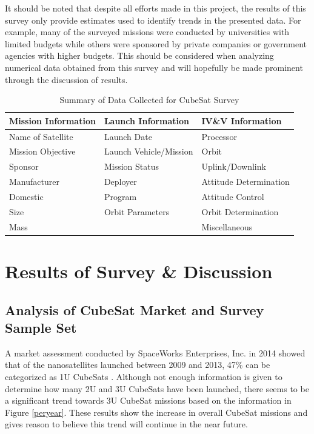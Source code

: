 \documentclass[11pt]{article}
\begin{document}
It should be noted that despite all efforts made in this project, the results of this survey only provide estimates used to identify trends in the presented data.  For example, many of the surveyed missions were conducted by universities with limited budgets while others were sponsored by private companies or government agencies with higher budgets.  This should be considered when analyzing numerical data obtained from this survey and will hopefully be made prominent through the discussion of results. 

\begin{table}[h]
\small
\centering
\caption{Summary of Data Collected for CubeSat Survey}
\label{summary}
\begin{tabular}{|l|l|l|}
\hline
\textbf{Mission Information} & \textbf{Launch Information} & \textbf{IV\&V Information} \\ \hline
Name of Satellite & Launch Date & Processor \\ \hline
Mission Objective & Launch Vehicle/Mission & Orbit \\ \hline
Sponsor & Mission Status & Uplink/Downlink \\ \hline
Manufacturer & Deployer & Attitude Determination \\ \hline
Domestic & Program & Attitude Control \\ \hline
Size & Orbit Parameters & Orbit Determination \\ \hline
Mass &  & Miscellaneous \\ \hline
\end{tabular}
\end{table}

\section{Results of Survey \& Discussion}
\subsection{Analysis of CubeSat Market and Survey Sample Set}
A market assessment conducted by SpaceWorks Enterprises, Inc. in 2014 showed that of the nanosatellites launched between 2009 and 2013, 47\% can be categorized as 1U CubeSats \cite{MarketAssessment}.  Although not enough information is given to determine how many 2U and 3U CubeSats have been launched, there seems to be a significant trend towards 3U CubeSat missions based on the information in Figure \ref{peryear}.  These results show the increase in overall CubeSat missions and gives reason to believe this trend will continue in the near future.
\end{document}

